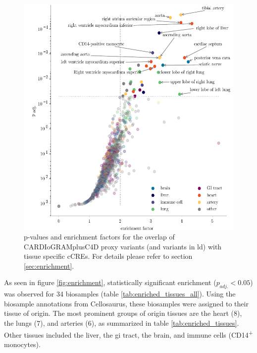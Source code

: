 \begin{figure}[h!]
\capstart
    \centering
	\includegraphics{Abbildung/enrichment_scatter.pdf}

	\begin{minipage}{\captionwidth}
		\caption[enrichemtn]{ \newline p-values and enrichment factors for the overlap of CARDIoGRAMplusC4D proxy variants (and variants in \ac{ld}) with tissue specific \acp{cCRE}. For details please refer to section \ref{sec:enrichment}.}
		\label{fig:enrichment_scatter}
	\end{minipage}
\end{figure}

As seen in figure \ref{fig:enrichment}, statistically significant enrichment ($p_{adj.}<0.05$) was observed for 34 biosamples (table \ref{tab:enriched_tissues_all}). Using the biosample annotations from Cellosaurus, these biosamples were assigned to their tissue of origin. The most prominent groups of origin tissues are the heart (8), the lungs (7), and arteries (6), as summarized in table \ref{tab:enriched_tissues}. Other tissues included the liver, the \ac{gi} tract, the brain, and immune cells (CD14\textsuperscript{+} monocytes).


